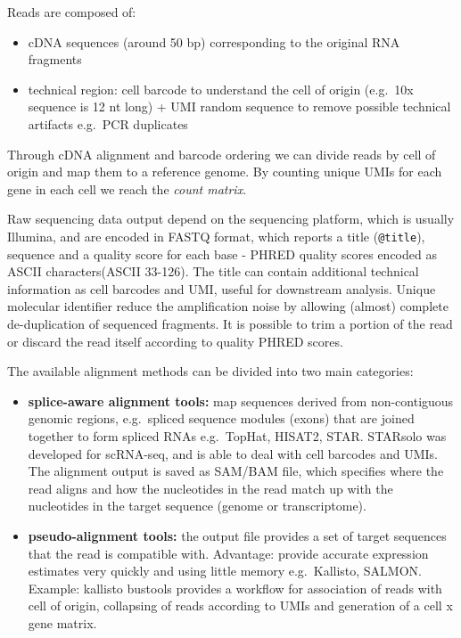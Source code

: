Reads are composed of:

\begin{itemize}
\tightlist
\item
  cDNA sequences (around 50 bp) corresponding to the original RNA
  fragments
\item
  technical region: cell barcode to understand the cell of origin
  (e.g.~10x sequence is 12 nt long) + UMI random sequence to remove
  possible technical artifacts e.g.~PCR duplicates
\end{itemize}

Through cDNA alignment and barcode ordering we can divide reads by cell
of origin and map them to a reference genome. By counting unique UMIs
for each gene in each cell we reach the \emph{count matrix}.

Raw sequencing data output depend on the sequencing platform, which is
usually Illumina, and are encoded in FASTQ format, which reports a title
(\texttt{@title}), sequence and a quality score for each base - PHRED
quality scores encoded as ASCII characters(ASCII 33-126). The title can
contain additional technical information as cell barcodes and UMI,
useful for downstream analysis. Unique molecular identifier reduce the
amplification noise by allowing (almost) complete de-duplication of
sequenced fragments. It is possible to trim a portion of the read or
discard the read itself according to quality PHRED scores.

The available alignment methods can be divided into two main categories:

\begin{itemize}
\tightlist
\item
  \textbf{splice-aware alignment tools:} map sequences derived from
  non-contiguous genomic regions, e.g.~spliced sequence modules (exons)
  that are joined together to form spliced RNAs e.g.~TopHat, HISAT2,
  STAR. STARsolo was developed for scRNA-seq, and is able to deal with
  cell barcodes and UMIs. The alignment output is saved as SAM/BAM file,
  which specifies where the read aligns and how the nucleotides in the
  read match up with the nucleotides in the target sequence (genome or
  transcriptome).
\item
  \textbf{pseudo-alignment tools:} the output file provides a set of
  target sequences that the read is compatible with. Advantage: provide
  accurate expression estimates very quickly and using little memory
  e.g.~Kallisto, SALMON. Example: kallisto \textbar{} bustools provides
  a workflow for association of reads with cell of origin, collapsing of
  reads according to UMIs and generation of a cell x gene matrix.
\end{itemize}

